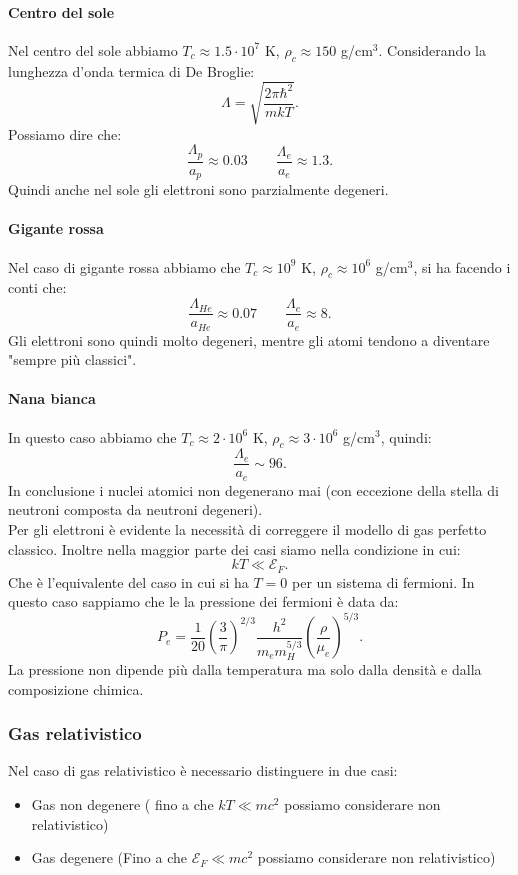 \paragraph{Centro del sole}
Nel centro del sole abbiamo $T_c \approx 1.5 \cdot 10^{7} $ K, $\rho _c \approx 150$ g/cm$^3$. Considerando la lunghezza d'onda termica di De Broglie:
\[
	\Lambda  = \sqrt{\frac{2\pi\hbar ^2}{mkT}} 
.\] 
Possiamo dire che:
\[
	\frac{\Lambda_p}{a_p} \approx 0.03 \quad \quad \frac{\Lambda_e}{a_e} \approx 1.3
.\] 
Quindi anche nel sole gli elettroni sono parzialmente degeneri.
\paragraph{Gigante rossa}
Nel caso di gigante rossa abbiamo che $T_c \approx 10^9$ K, $\rho _c \approx 10^6$ g/cm$^3$, si ha facendo i conti che:
\[
	\frac{\Lambda_{He}}{a_{He}} \approx 0.07 \quad \quad \frac{\Lambda_e}{a_e} \approx 8
.\] 
Gli elettroni sono quindi molto degeneri, mentre gli atomi tendono a diventare "sempre più classici".
\paragraph{Nana bianca}
In questo caso abbiamo che $T_c \approx 2 \cdot 10^{6} $ K, $\rho _c \approx 3 \cdot 10^{6} $ g/cm$^3$, quindi:
\[
	\frac{\Lambda_e}{a_e} \sim 96
.\] 
In conclusione i nuclei atomici non degenerano mai (con eccezione della stella di neutroni composta da neutroni degeneri).\\
Per gli elettroni è evidente la necessità di correggere il modello di gas perfetto classico. Inoltre nella maggior parte dei casi siamo nella condizione in cui:
\[
	kT\ll\mathcal{E}_F
.\] 
Che è l'equivalente del caso in cui si ha $T=0 $ per un sistema di fermioni. In questo caso sappiamo che le la pressione dei fermioni è data da:
\[
	P_e = \frac{1}{20}\left( \frac{3}{\pi} \right)^{2/3}\frac{h ^2}{m_e m_H^{5/3}}\left( \frac{\rho }{\mu_e} \right)^{5/3}
.\] 
La pressione non dipende più dalla temperatura ma solo dalla densità e dalla composizione chimica.
\subsubsection{Gas relativistico}
\label{subsubsec:Gas relativistico}
Nel caso di gas relativistico è necessario distinguere in due casi:
\begin{itemize}
	\item Gas non degenere ( fino a che $kT\ll mc^2$ possiamo considerare non relativistico)
	\item Gas degenere (Fino a che $\mathcal{E}_F\ll mc^2$ possiamo considerare non relativistico)
\end{itemize}
